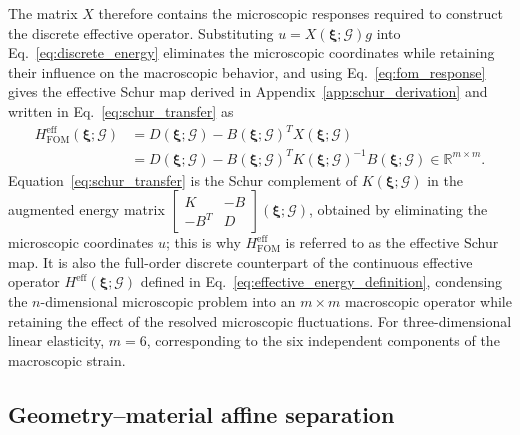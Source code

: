 \documentclass[pdflatex,sn-basic,Numbered]{sn-jnl}
\newcommand{\R}{\mathbb{R}}
\newcommand{\G}{\mathcal{G}}
\newcommand{\Heff}{H^{\mathrm{eff}}}
\newcommand{\Hfom}{H^{\mathrm{eff}}_{\mathrm{FOM}}}
\begin{document}
The matrix \(X\) therefore contains the microscopic responses required to
construct the discrete effective operator. Substituting
\(u=X(\boldsymbol\xi;\G)g\) into Eq.~\eqref{eq:discrete_energy} eliminates
the microscopic coordinates while retaining their influence on the
macroscopic behavior, and using Eq.~\eqref{eq:fom_response} gives the
effective Schur map derived in Appendix~\ref{app:schur_derivation} and written
in Eq.~\eqref{eq:schur_transfer} as
\begin{equation}
\label{eq:schur_transfer}
\begin{aligned}
\Hfom(\boldsymbol\xi;\G)
&=D(\boldsymbol\xi;\G)-B(\boldsymbol\xi;\G)^TX(\boldsymbol\xi;\G)\\
&=D(\boldsymbol\xi;\G)-B(\boldsymbol\xi;\G)^TK(\boldsymbol\xi;\G)^{-1}
B(\boldsymbol\xi;\G)\in\R^{m\times m}.
\end{aligned}
\end{equation}
Equation~\eqref{eq:schur_transfer} is the Schur complement of
\(K(\boldsymbol\xi;\G)\) in the augmented energy matrix
\(\begin{bmatrix}K&-B\\-B^T&D\end{bmatrix}(\boldsymbol\xi;\G)\), obtained by
eliminating the microscopic coordinates \(u\); this is why \(\Hfom\) is
referred to as the effective Schur map. It is also the full-order discrete
counterpart of the continuous effective operator
\(\Heff(\boldsymbol\xi;\G)\) defined in
Eq.~\eqref{eq:effective_energy_definition}, condensing the
\(n\)-dimensional microscopic problem into an \(m\times m\) macroscopic
operator while retaining the effect of the resolved microscopic
fluctuations. For three-dimensional linear elasticity, \(m=6\),
corresponding to the six independent components of the macroscopic strain.

\subsection{Geometry--material affine separation}
\label{subsec:affine_separation}
\end{document}
